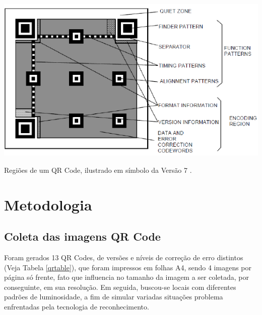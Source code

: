 \documentclass{ceel}
\begin{document}
\begin{multicols}{2}
\vspace{0.25cm}
\hspace{-0.45cm}
\begin{minipage}[h]{\columnwidth}
\captionsetup{type=figure, margin=5pt}
\includegraphics[width=\columnwidth]{regioes-qr-upercase}
\caption{\label{regioes}Regiões de um QR Code, ilustrado em símbolo da Versão 7 \cite{chines}.} 
\end{minipage}

\section{Metodologia} \label{metodologia}

\subsection{Coleta das imagens QR Code}
Foram gerados 13 QR Codes, de versões e níveis de correção de erro distintos (Veja Tabela \ref{qrtable}), que foram impressos em folhas A4, sendo 4 imagens por página só frente, fato que influencia no tamanho da imagem a ser coletada, por conseguinte, em sua resolução. Em seguida, buscou-se locais com diferentes padrões de luminosidade, a fim de simular variadas situações problema enfrentadas pela tecnologia de reconhecimento.


\end{multicols}
\end{document}

